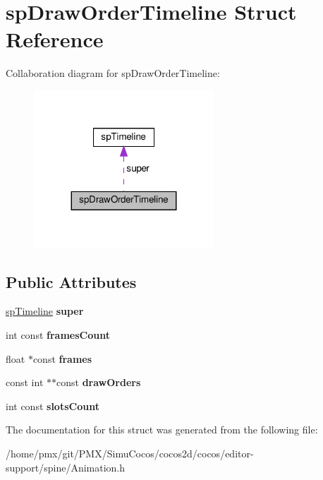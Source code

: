 \hypertarget{structspDrawOrderTimeline}{}\section{sp\+Draw\+Order\+Timeline Struct Reference}
\label{structspDrawOrderTimeline}


Collaboration diagram for sp\+Draw\+Order\+Timeline\+:
\nopagebreak
\begin{figure}[H]
\begin{center}
\leavevmode
\includegraphics[width=191pt]{structspDrawOrderTimeline__coll__graph}
\end{center}
\end{figure}
\subsection*{Public Attributes}
\begin{DoxyCompactItemize}
\item 
\mbox{\label{structspDrawOrderTimeline_a5c73b2216dcef146381c94fdcf2dab3a}} 
\hyperlink{structspTimeline}{sp\+Timeline} {\bfseries super}
\item 
\mbox{\label{structspDrawOrderTimeline_a898aaf18129d885c978b56181c0efce5}} 
int const {\bfseries frames\+Count}
\item 
\mbox{\label{structspDrawOrderTimeline_ad073feb1c93919b30461db35ef3669d7}} 
float $\ast$const {\bfseries frames}
\item 
\mbox{\label{structspDrawOrderTimeline_ad601af2f1c0b1efac01e1805c99d2d89}} 
const int $\ast$$\ast$const {\bfseries draw\+Orders}
\item 
\mbox{\label{structspDrawOrderTimeline_adf3b38c6a816664eb9a52ba54f76ae72}} 
int const {\bfseries slots\+Count}
\end{DoxyCompactItemize}


The documentation for this struct was generated from the following file\+:\begin{DoxyCompactItemize}
\item 
/home/pmx/git/\+P\+M\+X/\+Simu\+Cocos/cocos2d/cocos/editor-\/support/spine/Animation.\+h\end{DoxyCompactItemize}
